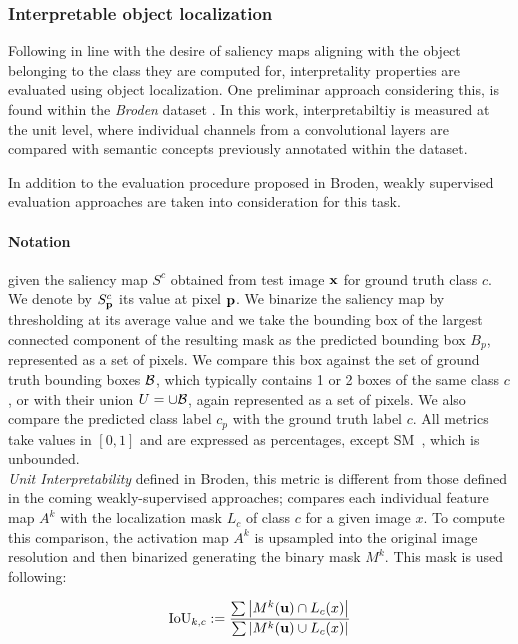 \subsubsection{Interpretable object localization}
\label{sec:loc-metrics}
Following in line with the desire of saliency maps aligning with the object belonging to the class 
they are computed for, interpretality properties are evaluated using object localization.
One preliminar approach considering this, is found within the \emph{Broden} dataset 
\autocite{bau2017network}. In this work, interpretabiltiy is measured at the unit level, where 
individual channels from a convolutional layers are compared with semantic concepts previously 
annotated within the dataset. 

In addition to the evaluation procedure proposed in Broden, weakly supervised evaluation approaches 
are taken into consideration for this task. 

\paragraph{Notation} given the saliency map $S^c$ obtained from test image $\mathbf{x}$ for ground truth 
class $c$. We denote by $S^c_{\mathbf{p}}$ its value at pixel $\mathbf{p}$. We binarize the saliency map by 
thresholding at its average value and we take the bounding box of the largest connected component 
of the resulting mask as the predicted bounding box $B_p$, represented as a set of pixels. We 
compare this box against the set of ground truth bounding boxes $\mathcal{B}$, which typically contains 1 
or 2 boxes of the same class $c$, or with their union $U = \cup \mathcal{B}$, again represented as a set 
of pixels. We also compare the predicted class label $c_p$ with the ground truth label $c$. All 
metrics take values in $[0,1]$ and are expressed as percentages, except SM~, which is 
unbounded.\\

\emph{Unit Interpretability} defined in Broden, this metric is different from those defined in 
the coming weakly-supervised approaches; compares each individual feature map $A^k$ with the 
localization mask $L_c$ of class $c$ for a given image $x$. To compute this comparison, 
the activation map $A^k$ is upsampled into the original image resolution and then binarized 
generating the binary mask $M^k$. This mask is used following:

\begin{equation}
	\operatorname{IoU}_{k,c} \mathrel{:=} \frac{\sum \abs{M^k(\mathbf{u}) \cap L_c(x)}}
					      {\sum \abs{M^k(\mathbf{u}) \cup L_c(x)}}
\end{equation}

